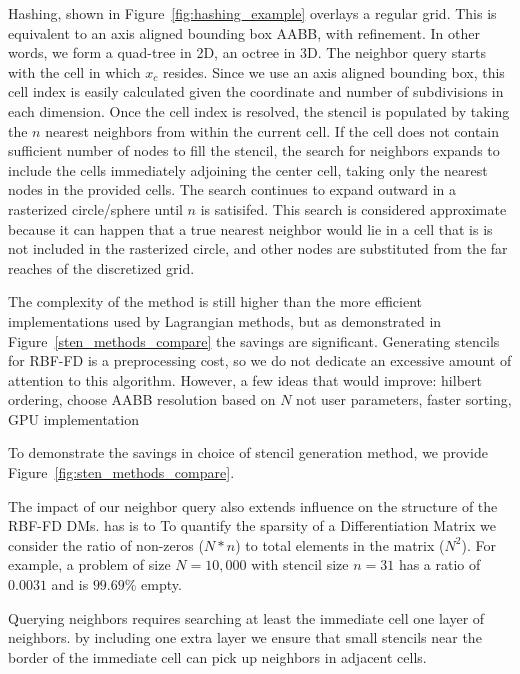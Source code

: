 \documentclass{report}
\begin{document}
Hashing, shown in Figure~\ref{fig:hashing_example} overlays a regular grid. This is equivalent to an axis aligned bounding box AABB, with refinement. In other words, we form a quad-tree in 2D, an octree in 3D. The neighbor query starts with the cell in which $x_c$ resides. Since we use an axis aligned bounding box, this cell index is easily calculated given the coordinate and number of subdivisions in each dimension. Once the cell index is resolved, the stencil is populated by taking the $n$ nearest neighbors from within the current cell. If the cell does not contain sufficient number of nodes to fill the stencil, the search for neighbors expands to include the cells immediately adjoining the center cell, taking only the nearest nodes in the provided cells. The search continues to expand outward in a rasterized circle/sphere until $n$ is satisifed. This search is considered approximate because it can happen that a true nearest neighbor would lie in a cell that is is not included in the rasterized circle, and other nodes are substituted from the far reaches of the discretized grid.

The complexity of the method is still higher than the more efficient implementations used by Lagrangian methods, but as demonstrated in Figure~\ref{sten_methods_compare} the savings are significant. Generating stencils for RBF-FD is a preprocessing cost, so we do not dedicate an excessive amount of attention to this algorithm. However, a few ideas that would improve: hilbert ordering, choose AABB resolution based on $N$ not user parameters, faster sorting, GPU implementation


To demonstrate the savings in choice of stencil generation method, we provide Figure~\ref{fig:sten_methods_compare}. 
 

The impact of our neighbor query also extends influence on the structure of the RBF-FD DMs.
has is to To quantify the sparsity of a Differentiation Matrix we consider the ratio of non-zeros ($N*n$) to total elements in the matrix ($N^2$). For example, a problem of size $N = 10,000$ with stencil size $n=31$ has a ratio of $0.0031$ and is $99.69\%$ empty. 

Querying neighbors requires searching at least the immediate cell one layer of neighbors. by including one extra layer we ensure that small stencils near the border of the immediate cell can pick up neighbors in adjacent cells.


\end{document}
